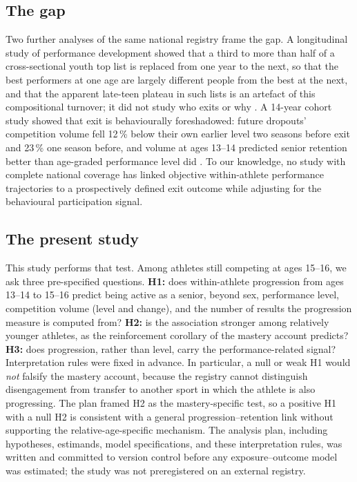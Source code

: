 \documentclass[12pt,a4paper]{article}
\begin{document}
\subsection{The gap}

Two further analyses of the same national registry frame the gap. A longitudinal study of performance development showed that a third to more than half of a cross-sectional youth top list is replaced from one year to the next, so that the best performers at one age are largely different people from the best at the next, and that the apparent late-teen plateau in such lists is an artefact of this compositional turnover; it did not study who exits or why \citep{guttormsen2026development}. A 14-year cohort study showed that exit is behaviourally foreshadowed: future dropouts' competition volume fell 12\,\% below their own earlier level two seasons before exit and 23\,\% one season before, and volume at ages 13--14 predicted senior retention better than age-graded performance level did \citep{guttormsen2026dropout}. To our knowledge, no study with complete national coverage has linked objective within-athlete performance trajectories to a prospectively defined exit outcome while adjusting for the behavioural participation signal.

\subsection{The present study}

This study performs that test. Among athletes still competing at ages 15--16, we ask three pre-specified questions. \textbf{H1:} does within-athlete progression from ages 13--14 to 15--16 predict being active as a senior, beyond sex, performance level, competition volume (level and change), and the number of results the progression measure is computed from? \textbf{H2:} is the association stronger among relatively younger athletes, as the reinforcement corollary of the mastery account predicts? \textbf{H3:} does progression, rather than level, carry the performance-related signal? Interpretation rules were fixed in advance. In particular, a null or weak H1 would \emph{not} falsify the mastery account, because the registry cannot distinguish disengagement from transfer to another sport in which the athlete is also progressing. The plan framed H2 as the mastery-specific test, so a positive H1 with a null H2 is consistent with a general progression--retention link without supporting the relative-age-specific mechanism. The analysis plan, including hypotheses, estimands, model specifications, and these interpretation rules, was written and committed to version control before any exposure--outcome model was estimated; the study was not preregistered on an external registry.
\end{document}
